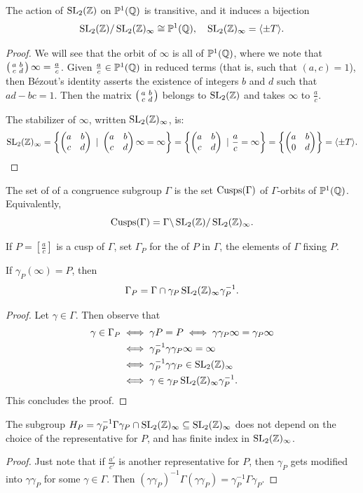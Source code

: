 \begin{proposition}
  The action of $\operatorname{SL}_2(\mathbb{Z})$ on $\mathbb{P}^1(\mathbb{Q})$ is transitive, and it induces a bijection
\[
\operatorname{SL}_2(\mathbb{Z})/\operatorname{SL}_2(\mathbb{Z})_\infty\cong \mathbb{P}^1(\mathbb{Q}),\quad \operatorname{SL}_2(\mathbb{Z})_\infty = \langle \pm T\rangle.
\]
\end{proposition}
\begin{proof}
  We will see that the orbit of $\infty$ is all of $\mathbb{P}^1(\mathbb{Q})$, where we note that $\left(\begin{smallmatrix}a&b\\c&d\end{smallmatrix}\right) \infty = \frac ac$. Given $\frac ac\in\mathbb{P}^1(\mathbb{Q})$ in reduced terms (that is, such that $(a,c)=1$), then B\'ezout's identity asserts the
existence of integers $b$ and $d$ such that $ad-bc=1$. Then the matrix $\left(\begin{smallmatrix}a&b\\c&d\end{smallmatrix}\right)$ belongs to $\operatorname{SL}_2(\mathbb{Z})$ and takes $\infty$ to $\frac ac$.

The stabilizer of $\infty$, written $\operatorname{SL}_2(\mathbb{Z})_\infty$, is:
\[
\operatorname{SL}_2(\mathbb{Z})_\infty = \left\{\left(\begin{matrix}a&b\\c&d\end{matrix}\right) ~|~ \left(\begin{matrix}a&b\\c&d\end{matrix}\right) \infty = \infty\right\} = \left\{\left(\begin{matrix}a&b\\c&d\end{matrix}\right) ~|~ \frac ac = \infty\right\} = \left\{\left(\begin{matrix}a&b\\0&d\end{matrix}\right)\right\} = \langle \pm T\rangle.
\]
\end{proof}

\begin{definition}
  The set of  of a congruence subgroup $\Gamma$ is the set $\operatorname{Cusps}(\Gamma)$ of $\Gamma$-orbits of $\mathbb{P}^1(\mathbb{Q})$. Equivalently,
\[
\operatorname{Cusps}(\Gamma) = \Gamma\backslash \operatorname{SL}_2(\mathbb{Z}) / \operatorname{SL}_2(\mathbb{Z})_\infty.
\]
\end{definition}

If $P = [\frac ac]$ is a cusp of $\Gamma$, set $\Gamma_P$ for the  of $P$ in $\Gamma$, the elements of $\Gamma$ fixing $P$.
\begin{lemma}
  If $\gamma_P(\infty) = P$, then
\[
\Gamma_P = \Gamma\cap \gamma_P\operatorname{SL}_2(\mathbb{Z})_\infty \gamma_P^{-1}.
\]
\end{lemma}
\begin{proof}
 Let $\gamma\in\Gamma$. Then observe that
\begin{align*}
\gamma\in\Gamma_P&\iff \gamma P = P\iff \gamma \gamma_P\infty=\gamma_P\infty\\
&\iff \gamma_P^{-1}\gamma\gamma_P\infty=\infty\\
&\iff \gamma_P^{-1}\gamma\gamma_P\in \operatorname{SL}_2(\mathbb{Z})_\infty\\
&\iff \gamma\in \gamma_P\operatorname{SL}_2(\mathbb{Z})_\infty \gamma_P^{-1}.
\end{align*}
This concludes the proof.
\end{proof}

\begin{lemma}
The subgroup $H_P = \gamma_P^{-1}\Gamma\gamma_P\cap \operatorname{SL}_2(\mathbb{Z})_\infty \subseteq \operatorname{SL}_2(\mathbb{Z})_\infty$
does not depend on the choice of the representative for $P$, and has finite index in $\operatorname{SL}_2(\mathbb{Z})_\infty$.
\end{lemma}
\begin{proof}
  Just note that if $\frac{a'}{c'}$ is another representative for $P$, then $\gamma_P$ gets modified into $\gamma\gamma_P$ for some $\gamma\in\Gamma$. Then $(\gamma\gamma_P)^{-1}\Gamma(\gamma\gamma_P) = \gamma_P^{-1}\Gamma\gamma_P$.
\end{proof}

